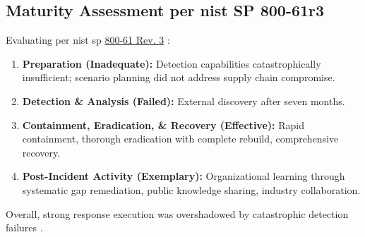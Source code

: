 \subsection{Maturity Assessment per \gls{nist} SP 800-61r3}
Evaluating per \gls{nist} \gls{sp} \href{https://csrc.nist.gov/pubs/sp/800/61/r3/final}{800-61 Rev. 3} \cite{nelson2025}:
\begin{enumerate}
    \item \textbf{Preparation (Inadequate):} Detection capabilities catastrophically insufficient; scenario planning did not address supply chain compromise.
    \item \textbf{Detection \& Analysis (Failed):} External discovery after seven months.
    \item \textbf{Containment, Eradication, \& Recovery (Effective):} Rapid containment, thorough eradication with complete rebuild, comprehensive recovery.
    \item \textbf{Post-Incident Activity (Exemplary):} Organizational learning through systematic gap remediation, public knowledge sharing, industry collaboration.
\end{enumerate}
Overall, strong response execution was overshadowed by catastrophic detection failures \cite{rose2020}.

